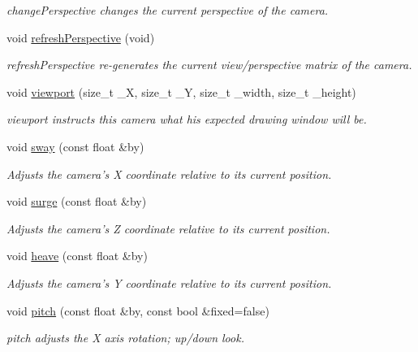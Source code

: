 \begin{DoxyCompactItemize}
\begin{DoxyCompactList}\small\item\em change\-Perspective changes the current perspective of the camera. \end{DoxyCompactList}\item 
void \hyperlink{class_camera_a24c5346fc0dfaa93257b6716fe0f2421}{refresh\-Perspective} (void)
\begin{DoxyCompactList}\small\item\em refresh\-Perspective re-\/generates the current view/perspective matrix of the camera. \end{DoxyCompactList}\item 
void \hyperlink{class_camera_adda458a9212825164b52019597f2e9c8}{viewport} (size\-\_\-t \-\_\-\-X, size\-\_\-t \-\_\-\-Y, size\-\_\-t \-\_\-width, size\-\_\-t \-\_\-height)
\begin{DoxyCompactList}\small\item\em viewport instructs this camera what his expected drawing window will be. \end{DoxyCompactList}\item 
void \hyperlink{class_camera_abbe6fe82ed05e64e35b0c4ed2001b34e}{sway} (const float \&by)
\begin{DoxyCompactList}\small\item\em \-Adjusts the camera's \-X coordinate relative to its current position. \end{DoxyCompactList}\item 
void \hyperlink{class_camera_abb2251df65445bf8efd3fe0074fb5033}{surge} (const float \&by)
\begin{DoxyCompactList}\small\item\em \-Adjusts the camera's \-Z coordinate relative to its current position. \end{DoxyCompactList}\item 
void \hyperlink{class_camera_a2148d751f104d8e39c9832e2372df2d9}{heave} (const float \&by)
\begin{DoxyCompactList}\small\item\em \-Adjusts the camera's \-Y coordinate relative to its current position. \end{DoxyCompactList}\item 
void \hyperlink{class_camera_aac7dbb6201be7f17e014fc6fdf915560}{pitch} (const float \&by, const bool \&fixed=false)
\begin{DoxyCompactList}\small\item\em pitch adjusts the \-X axis rotation; up/down look. \end{DoxyCompactList}\item 

\end{DoxyCompactItemize}
